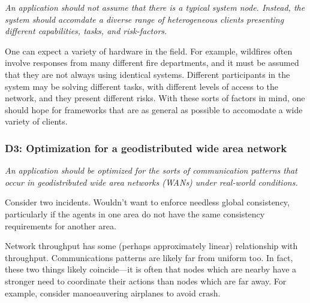 \emph{An application should not assume that there is a typical system
node. Instead, the system should accomdate a diverse range of
heterogeneous clients presenting different capabilities, tasks, and
risk-factors.}

One can expect a variety of hardware in the field. For example,
wildfires often involve responses from many different fire
departments, and it must be assumed that they are not always using
identical systems. Different participants in the system may be solving
different tasks, with different levels of access to the network, and
they present different risks. With these sorts of factors in mind, one
should hope for frameworks that are as general as possible to
accomodate a wide variety of clients.

\subsubsection*{D3: Optimization for a geodistributed wide area network}

\emph{An application should be optimized for the sorts of
communication patterns that occur in geodistributed wide area networks
(WANs) under real-world conditions.}

Consider two incidents. Wouldn't want to enforce needless global
consistency, particularly if the agents in one area do not have the
same consistency requirements for another area.

Network throughput has some (perhaps approximately linear)
relationship with throughput. Communications patterns are likely far
from uniform too. In fact, these two things likely coincide---it is
often that nodes which are nearby have a stronger need to coordinate
their actions than nodes which are far away. For example, consider
manoeauvering airplanes to avoid crash.
